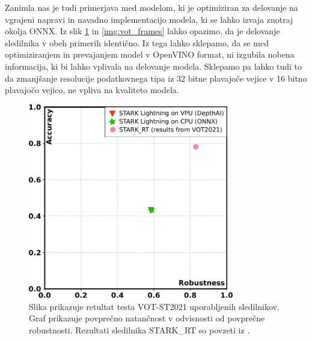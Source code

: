 \documentclass[a4paper,12pt,openright]{book}
\begin{document}
Zanimla nas je tudi primerjava med modelom, ki je optimiziran za delovanje na vgrajeni napravi in navadno implementacijo modela, ki se lahko izvaja znotraj okolja ONNX. Iz slik \ref{img:vot_ar} in \ref{img:vot_frames} lahko opazimo, da je delovanje sledilnika v obeh primerih identično. Iz tega lahko sklepamo, da se med optimiziranjem in prevajanjem model v OpenVINO format, ni izgubila nobena informacija, ki bi lahko vplivala na delovanje modela. Sklepamo pa lahko tudi to da zmanjšanje resolucije podatkovnega tipa iz 32 bitne plavajoče vejice v 16 bitno plavajočo vejico, ne vpliva na kvaliteto modela.

\begin{figure}[htb]
    \begin{center}
        \includegraphics[width=0.8\textwidth]{img/vot_ar_plot.pdf}
    \end{center}
    \caption{Slika prikazuje retultat testa VOT-ST2021 uporabljenih sledilnikov. Graf prikazuje povprečno natančnost v odvisnosti od povprečne robustnosti. Rezultati sledilnika STARK\_RT so povzeti iz \cite{vot2021}.}
    \label{img:vot_ar}
\end{figure}
\end{document}
